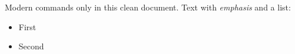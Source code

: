 \documentclass{article}
\begin{document}
Modern commands only in this clean document.
Text with \emph{emphasis} and a list:
\begin{itemize}
\item First
\item Second
\end{itemize}
\end{document}

